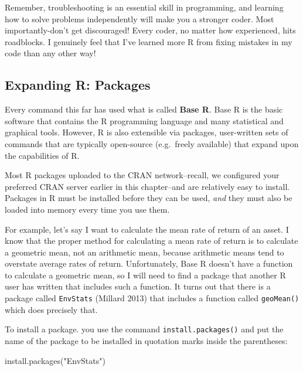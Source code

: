 \documentclass[
  letterpaper,
]{book}
\newenvironment{Shaded}{\begin{snugshade}}{\end{snugshade}}
\newcommand{\FunctionTok}[1]{\textcolor[rgb]{0.28,0.35,0.67}{#1}}
\newcommand{\NormalTok}[1]{\textcolor[rgb]{0.00,0.23,0.31}{#1}}
\newcommand{\StringTok}[1]{\textcolor[rgb]{0.13,0.47,0.30}{#1}}
\begin{document}
\begin{tcolorbox}
Remember, troubleshooting is an essential skill in programming, and
learning how to solve problems independently will make you a stronger
coder. Most importantly-don't get discouraged! Every coder, no matter
how experienced, hits roadblocks. I genuinely feel that I've learned
more R from fixing mistakes in my code than any other way!

\end{tcolorbox}

\subsection{Expanding R: Packages}\label{expanding-r-packages}

Every command this far has used what is called \textbf{Base R}. Base R
is the basic software that contains the R programming language and many
statistical and graphical tools. However, R is also extensible via
packages, user-written sets of commands that are typically open-source
(e.g.~freely available) that expand upon the capabilities of R.

Most R packages uploaded to the CRAN network--recall, we configured your
preferred CRAN server earlier in this chapter--and are relatively easy
to install. Packages in R must be installed before they can be used,
\emph{and} they must also be loaded into memory every time you use them.

For example, let's say I want to calculate the mean rate of return of an
asset. I know that the proper method for calculating a mean rate of
return is to calculate a geometric mean, not an arithmetic mean, because
arithmetic means tend to overstate average rates of return.
Unfortunately, Base R doesn't have a function to calculate a geometric
mean, so I will need to find a package that another R user has written
that includes such a function. It turns out that there is a package
called \texttt{EnvStats} (Millard 2013) that includes a function called
\texttt{geoMean()} which does precisely that.

To install a package. you use the command \texttt{install.packages()}
and put the name of the package to be installed in quotation marks
inside the parentheses:

\begin{Shaded}
\begin{Highlighting}[]
\FunctionTok{install.packages}\NormalTok{(}\StringTok{"EnvStats"}\NormalTok{)}
\end{Highlighting}
\end{Shaded}
\end{document}
